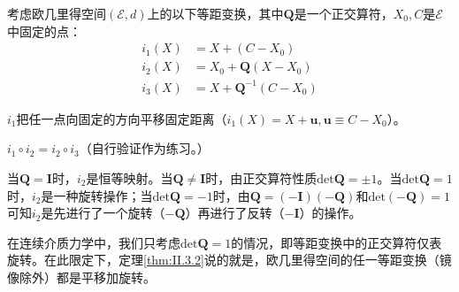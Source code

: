 \documentclass[main.tex]{subfiles}
\begin{document}
\begin{example}
    考虑欧几里得空间$\left(\mathcal{E},d\right)$上的以下等距变换，其中$\mathbf{Q}$是一个正交算符，$X_0,C$是$\mathcal{E}$中固定的点：
    \begin{align*}
        i_1\left(X\right) & =X+\left(C-X_0\right)                \\
        i_2\left(X\right) & =X_0+\mathbf{Q}\left(X-X_0\right)    \\
        i_3\left(X\right) & =X+\mathbf{Q}^{-1}\left(C-X_0\right)
    \end{align*}

    $i_1$把任一点向固定的方向平移固定距离（$i_1\left(X\right)=X+\mathbf{u},\mathbf{u}\equiv C-X_0$）。

    $i_1\circ i_2=i_2\circ i_3$（自行验证作为练习。）

    当$\mathbf{Q}=\mathbf{I}$时，$i_2$是恒等映射。当$\mathbf{Q}\neq\mathbf{I}$时，由正交算符性质$\mathrm{det}\mathbf{Q}=\pm 1$。当$\mathrm{det}\mathbf{Q}=1$时，$i_2$是一种旋转操作；当$\mathrm{det}\mathbf{Q}=-1$时，由$\mathbf{Q}=\left(-\mathbf{I}\right)\left(-\mathbf{Q}\right)$和$\mathrm{det}\left(-\mathbf{Q}\right)=1$可知$i_2$是先进行了一个旋转（$-\mathbf{Q}$）再进行了反转（$-\mathbf{I}$）的操作。
\end{example}

在连续介质力学中，我们只考虑$\mathrm{det}\mathbf{Q}=1$的情况，即等距变换中的正交算符仅表旋转。在此限定下，定理\ref{thm:II.3.2}说的就是，欧几里得空间的任一等距变换（镜像除外）都是平移加旋转。
\end{document}
